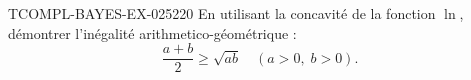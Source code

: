 \begin{exercice}{TCOMPL-BAYES-EX-025}{2}{20}
En utilisant la concavité de la fonction $\ln$, démontrer l'inégalité arithmetico-géométrique :
\[ \frac{a+b}{2} \geq \sqrt{ab} \quad (a > 0,\; b > 0). \]

\end{exercice}
